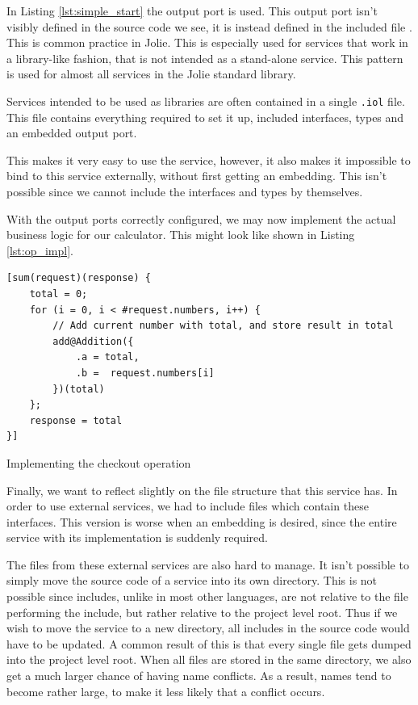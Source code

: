 In Listing \ref{lst:simple_start} the output port  is used. This
output port isn't visibly defined in the source code we see, it is instead
defined in the included file . This is common practice in
Jolie. This is especially used for services that work in a library-like
fashion, that is not intended as a stand-alone service. This pattern is used
for almost all services in the Jolie standard library\autocite{JOLB}.

\begin{observation}

Services intended to be used as libraries are often contained in a single
\verb!.iol! file. This file contains everything required to set it up, included
interfaces, types and an embedded output port.

This makes it very easy to use the service, however, it also makes it
impossible to bind to this service externally, without first getting an
embedding. This isn't possible since we cannot include the interfaces and
types by themselves.

\end{observation}

With the output ports correctly configured, we may now implement the actual
business logic for our calculator. This might look like shown in Listing
\ref{lst:op_impl}.

\begin{listing}[H]
\begin{verbatim}
[sum(request)(response) {
    total = 0;
    for (i = 0, i < #request.numbers, i++) {
        // Add current number with total, and store result in total
        add@Addition({
            .a = total,
            .b =  request.numbers[i]
        })(total)
    };
    response = total
}]
\end{verbatim}
\caption{Implementing the checkout operation}
\label{lst:op_impl}
\end{listing}

Finally, we want to reflect slightly on the file structure that this service
has. In order to use external services, we had to include files which contain
these interfaces. This version is worse when an embedding is desired, since the
entire service with its implementation is suddenly required.

The files from these external services are also hard to manage. It isn't
possible to simply move the source code of a service into its own directory.
This is not possible since includes, unlike in most other languages, are not
relative to the file performing the include, but rather relative to the project
level root. Thus if we wish to move the service to a new directory, all
includes in the source code would have to be updated. A common result of this
is that every single file gets dumped into the project level root. When all
files are stored in the same directory, we also get a much larger chance of
having name conflicts. As a result, names tend to become rather large, to make
it less likely that a conflict occurs.

